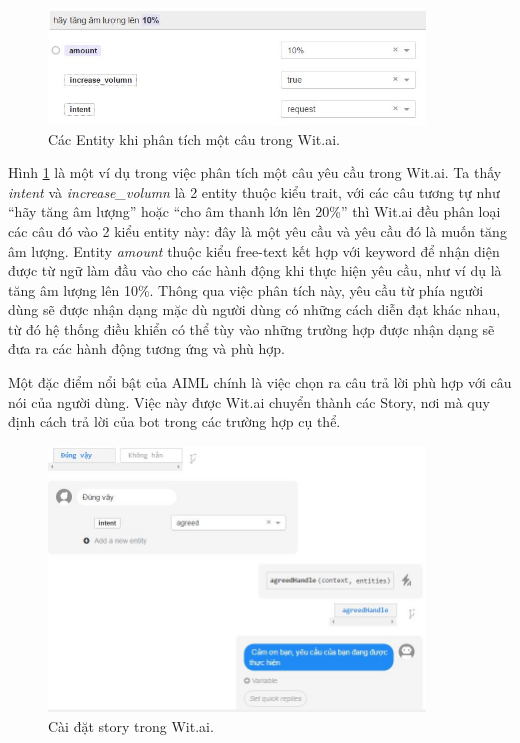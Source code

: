 \documentclass[12pt]{report}
\begin{document}
\begin{figure}[H] 
	\centering
	\includegraphics[width=10cm]{Pics/Chap6/wit.JPG}
	\caption{Các Entity khi phân tích một câu trong Wit.ai.}
	\label{fig:entity}
\end{figure}

Hình \ref{fig:entity} là một ví dụ trong việc phân tích một câu yêu cầu trong Wit.ai. Ta thấy \textit{intent} và \textit{increase\_volumn} là 2 entity thuộc kiểu trait, với các câu tương tự như ``hãy tăng âm lượng'' hoặc ``cho âm thanh lớn lên 20\%'' thì Wit.ai đều phân loại các câu đó vào 2 kiểu entity này: đây là một yêu cầu và yêu cầu đó là muốn tăng âm lượng. Entity \textit{amount} thuộc kiểu free-text kết hợp với keyword để nhận diện được từ ngữ làm đầu vào cho các hành động khi thực hiện yêu cầu, như ví dụ là tăng âm lượng lên 10\%. Thông qua việc phân tích này, yêu cầu từ phía người dùng sẽ được nhận dạng mặc dù người dùng có những cách diễn đạt khác nhau, từ đó hệ thống điều khiển có thể tùy vào những trường hợp được nhận dạng sẽ đưa ra các hành động tương ứng và phù hợp.

Một đặc điểm nổi bật của AIML chính là việc chọn ra câu trả lời phù hợp với câu nói của người dùng. Việc này được Wit.ai chuyển thành các Story, nơi mà quy định cách trả lời của bot trong các trường hợp cụ thể. 
 
\begin{figure}[H] \label{fig:story-wit}
	\centering
	\includegraphics[width=10cm]{Pics/Chap6/story.JPG}
	\caption{Cài đặt story trong Wit.ai.}
\end{figure}
\end{document}
